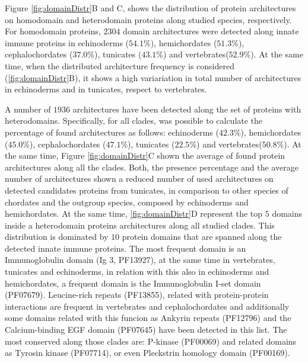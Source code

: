 \documentclass[11pt]{article}
\begin{document}
Figure \ref{fig:domainDistr}B and C, shows the distribution of protein 
architectures on homodomain and heterodomain proteins along studied species, 
respectively. For homodomain proteins, $2304$ domain architectures were 
detected along innate immune proteins in echinoderms ($54.1$\%), hemichordates 
($51.3$\%), cephalochordates ($37.0$\%), tunicates ($43.1$\%) and 
vertebrates($52.9$\%). At the same time, when the distributed architecture 
frequency  is considered (\ref{fig:domainDistr}B), it shows a high variariation 
in total number of architectures in echinoderms and in tunicates, respect to 
vertebrates.

A number of $1936$ architectures have been detected along the set of proteins 
with heterodomains. Specifically, for all clades, was possible to calculate the 
percentage of found architectures as follows: echinoderms ($42.3$\%), hemichordates ($45.0$\%),
cephalochordates ($47.1$\%), tunicates ($22.5$\%) and vertebrates($50.8$\%). 
At the same time, Figure \ref{fig:domainDistr}C shown the average of found 
protein architectures along all the clades. Both, the presence percentage 
and the average number of architectures shown a reduced number of used 
architectures on detected candidates proteins from tunicates, in comparison 
to other species of chordates and the outgroup species, composed by 
echinoderms and hemichordates. 
At the same time, \ref{fig:domainDistr}D represent the top $5$ domains 
inside a heterodomain proteins architectures along all studied clades. This 
distribution is dominated by $10$ protein domains that are spanned 
along the detected innate immune proteins. The most frequent domain is an 
Immunoglobulin domain (Ig 3, PF13927), at the same time in vertebrates, 
tunicates and echinoderms, in relation with this also in echinoderms
and hemichordates, a frequent domain is the Immunoglobulin I-set domain 
(PF07679). Leucine-rich repeats (PF13855), related with protein-protein 
interactions are frequent in vertebrates and cephalochordates and additionally 
some domains related with this funcion as Ankyrin repeats (PF12796) and the 
Calcium-binding EGF domain (PF07645) have been detected in this list. The most 
conserved along those clades are: P-kinase (PF00069) and related domains as 
Tyrosin kinase (PF07714), or even Pleckstrin homology domain (PF00169).
 
\end{document}
